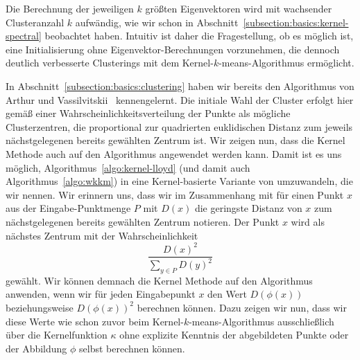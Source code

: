 Die Berechnung der jeweiligen $k$ größten Eigenvektoren wird mit wachsender Clusteranzahl
$k$ aufwändig, wie wir schon in Abschnitt~\ref{subsection:basics:kernel-spectral} beobachtet haben.
Intuitiv ist daher die Fragestellung, ob es möglich ist, eine Initialisierung ohne Eigenvektor-Berechnungen vorzunehmen,
die dennoch deutlich verbesserte Clusterings mit dem Kernel-$k$-means-Algorithmus ermöglicht.

In Abschnitt~\ref{subsection:basics:clustering} haben wir bereits den Algorithmus \kmpp{} von Arthur und
Vassilvitskii~\cite{ArthurV07} kennengelernt. Die initiale Wahl der Cluster erfolgt hier gemäß einer
Wahrscheinlichkeitsverteilung der Punkte als mögliche Clusterzentren, die proportional zur quadrierten euklidischen Distanz
zum jeweils nächstgelegenen bereits gewählten Zentrum ist. Wir zeigen nun, dass die Kernel Methode auch auf den Algorithmus
\kmpp{} angewendet werden kann. Damit ist es uns möglich, Algorithmus~\ref{algo:kernel-lloyd} (und damit
auch Algorithmus~\ref{algo:wkkm}) in eine Kernel-basierte Variante von \kmpp{} umzuwandeln, die wir \kkmpp{} nennen.
\absatz
Wir erinnern uns, dass wir im Zusammenhang mit \kmpp{} für einen Punkt $x$ aus der Eingabe-Punktmenge $P$ mit $D(x)$
die geringste Distanz von $x$ zum nächstgelegenen bereits gewählten Zentrum notieren. Der Punkt $x$ wird als nächstes
Zentrum mit der Wahrscheinlichkeit
\[ \frac{D(x)^2}{\sum_{y \in P} D(y)^2} \]
gewählt. Wir können demnach die Kernel Methode auf den Algorithmus \kmpp{} anwenden, wenn wir für jeden Eingabepunkt $x$ den
Wert $D(\phi(x))$ beziehungsweise $D(\phi(x))^2$ berechnen können. Dazu zeigen wir nun, dass wir diese Werte wie schon zuvor
beim Kernel-$k$-means-Algorithmus ausschließlich über die Kernelfunktion $\kappa$ ohne explizite Kenntnis der abgebildeten
Punkte oder der Abbildung $\phi$ selbst berechnen können.

